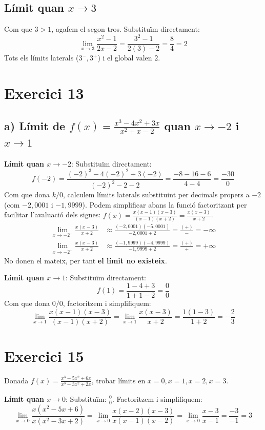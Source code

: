 \documentclass[12pt,a4paper]{article}
\begin{document}
\subsection*{Límit quan $x \to 3$}
Com que $3 > 1$, agafem el segon tros. Substituïm directament:
\[ \lim_{x \to 3} \frac{x^2-1}{2x-2} = \frac{3^2-1}{2(3)-2} = \frac{8}{4} = 2 \]
Tots els límits laterals ($3^-, 3^+$) i el global valen $2$.

\vspace{0.5cm}
\section*{Exercici 13}
\subsection*{a) Límit de $f(x) = \frac{x^3-4x^2+3x}{x^2+x-2}$ quan $x \to -2$ i $x \to 1$}

\textbf{Límit quan $x \to -2$}:
Substituïm directament:
\[ f(-2) = \frac{(-2)^3 - 4(-2)^2 + 3(-2)}{(-2)^2 - 2 - 2} = \frac{-8 - 16 - 6}{4 - 4} = \frac{-30}{0} \]
Com que dona $k/0$, calculem límits laterals substituint per decimals propers a $-2$ (com $-2,0001$ i $-1,9999$). Podem simplificar abans la funció factoritzant per facilitar l'avaluació dels signes: $f(x) = \frac{x(x-1)(x-3)}{(x-1)(x+2)} = \frac{x(x-3)}{x+2}$.
\begin{align*}
    \lim_{x \to -2^-} \frac{x(x-3)}{x+2} & \approx \frac{(-2,0001)(-5,0001)}{-2,0001 + 2} = \frac{(+)}{-} = -\infty \\
    \lim_{x \to -2^+} \frac{x(x-3)}{x+2} & \approx \frac{(-1,9999)(-4,9999)}{-1,9999 + 2} = \frac{(+)}{+} = +\infty
\end{align*}
No donen el mateix, per tant \textbf{el límit no existeix}.

\textbf{Límit quan $x \to 1$}:
Substituïm directament:
\[ f(1) = \frac{1 - 4 + 3}{1 + 1 - 2} = \frac{0}{0} \]
Com que dona $0/0$, factoritzem i simplifiquem:
\[ \lim_{x \to 1} \frac{x(x-1)(x-3)}{(x-1)(x+2)} = \lim_{x \to 1} \frac{x(x-3)}{x+2} = \frac{1(1-3)}{1+2} = -\frac{2}{3} \]

\vspace{0.5cm}
\section*{Exercici 15}
Donada $f(x) = \frac{x^3-5x^2+6x}{x^3-3x^2+2x}$, trobar límits en $x=0, x=1, x=2, x=3$.

\textbf{Límit quan $x \to 0$}:
Substituïm: $\frac{0}{0}$. Factoritzem i simplifiquem:
\[ \lim_{x \to 0} \frac{x(x^2-5x+6)}{x(x^2-3x+2)} = \lim_{x \to 0} \frac{x(x-2)(x-3)}{x(x-1)(x-2)} = \lim_{x \to 0} \frac{x-3}{x-1} = \frac{-3}{-1} = 3 \]
\end{document}
